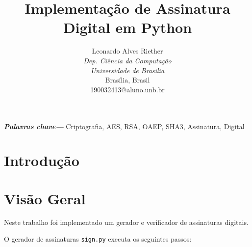 \documentclass[a4paper, 10.5pt]{article}
\begin{document}
\providecommand{\keywords}[1]
{
  \small	
  \textbf{\textit{Palavras chave---}} #1
}

\title{Implementação de Assinatura Digital em Python}

\author{Leonardo Alves Riether \\
    \textit{Dep. Ciência da Computação} \\
    \textit{Universidade de Brasilia}\\
    Brasília, Brasil \\
    190032413@aluno.unb.br
}

\maketitle


\begin{abstract}
\end{abstract}

\keywords{Criptografia, AES, RSA, OAEP, SHA3, Assinatura, Digital}

\listoftodos

\section{Introdução} %


\section{Visão Geral} %
\label{sec:visao-geral}
    Neste trabalho foi implementado um gerador e verificador de assinaturas
    digitais.

    O gerador de assinaturas \verb|sign.py| executa os seguintes passos:
\end{document}
